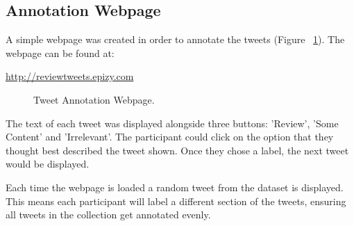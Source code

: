 \subsection{Annotation Webpage}

A simple webpage was created in order to annotate the tweets (Figure ~\ref{fig:webpage}). The webpage can be found at:
\begin{center}
    \url{http://reviewtweets.epizy.com}\newline
\end{center}

\begin{figure}[h!]
\centering
{}
\caption{\label{fig:webpage} Tweet Annotation Webpage.}
\end{figure}

The text of each tweet was displayed alongside three buttons: 'Review', 'Some Content' and 'Irrelevant'. The participant could click on the option that they thought best described the tweet shown. Once they chose a label, the next tweet would be displayed. 

Each time the webpage is loaded a random tweet from the dataset is displayed. This means each participant will label a different section of the tweets, ensuring all tweets in the collection get annotated evenly.

